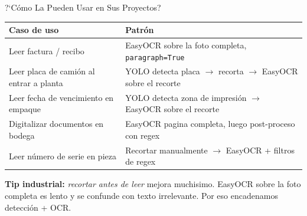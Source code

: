 \documentclass[aspectratio=169, 11pt]{beamer}
\begin{document}
\begin{frame}[shrink]{?`C\'omo La Pueden Usar en Sus Proyectos?}
  \vspace{6pt}
  {\footnotesize
  \begin{tabular}{@{}p{4.5cm} p{8.0cm}@{}}
    \toprule
    \textbf{Caso de uso} & \textbf{Patr\'on} \\
    \midrule
    \rowcolor{arcaGray}
    Leer factura / recibo
    & EasyOCR sobre la foto completa, \texttt{paragraph=True} \\
    Leer placa de cami\'on al entrar a planta
    & YOLO detecta placa $\to$ recorta $\to$ EasyOCR sobre el recorte \\
    \rowcolor{arcaGray}
    Leer fecha de vencimiento en empaque
    & YOLO detecta zona de impresi\'on $\to$ EasyOCR sobre el recorte \\
    Digitalizar documentos en bodega
    & EasyOCR pagina completa, luego post-proceso con regex \\
    \rowcolor{arcaGray}
    Leer n\'umero de serie en pieza
    & Recortar manualmente $\to$ EasyOCR + filtros de regex \\
    \bottomrule
  \end{tabular}
  }

  \vspace{10pt}
  \begin{tcolorbox}[colback=codeGreen!8, colframe=codeGreen, boxrule=0.5pt,
    arc=2pt, left=6pt, right=6pt, top=4pt, bottom=4pt]
    {\scriptsize\color{arcaDark}
    \faKey\hspace{4pt}\textbf{Tip industrial:} \emph{recortar antes de
    leer} mejora muchisimo. EasyOCR sobre la foto completa es lento y se
    confunde con texto irrelevante. Por eso encadenamos detecci\'on + OCR.}
  \end{tcolorbox}
\end{frame}
\end{document}
